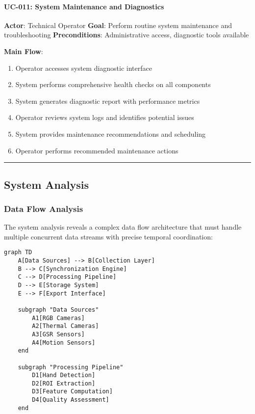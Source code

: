 \documentclass[12pt,a4paper]{report}
\begin{document}
\paragraph{UC-011: System Maintenance and Diagnostics}

\textbf{Actor}: Technical Operator  
\textbf{Goal}: Perform routine system maintenance and troubleshooting  
\textbf{Preconditions}: Administrative access, diagnostic tools available

\textbf{Main Flow}:

\begin{enumerate}
\item Operator accesses system diagnostic interface
\item System performs comprehensive health checks on all components
\item System generates diagnostic report with performance metrics
\item Operator reviews system logs and identifies potential issues
\item System provides maintenance recommendations and scheduling
\item Operator performs recommended maintenance actions

\end{enumerate}
\hrule

\subsection{System Analysis}

\subsubsection{Data Flow Analysis}

The system analysis reveals a complex data flow architecture that must handle multiple concurrent data streams with
precise temporal coordination:

\begin{verbatim}
graph TD
    A[Data Sources] --> B[Collection Layer]
    B --> C[Synchronization Engine]
    C --> D[Processing Pipeline]
    D --> E[Storage System]
    E --> F[Export Interface]

    subgraph "Data Sources"
        A1[RGB Cameras]
        A2[Thermal Cameras]
        A3[GSR Sensors]
        A4[Motion Sensors]
    end

    subgraph "Processing Pipeline"
        D1[Hand Detection]
        D2[ROI Extraction]
        D3[Feature Computation]
        D4[Quality Assessment]
    end
\end{verbatim}
\end{document}

